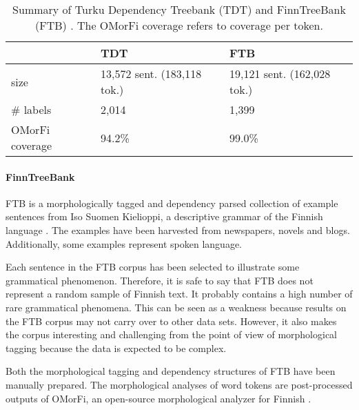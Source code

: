\begin{table}[htb!]
\begin{center}
\begin{tabular}{l|l|l} 
 & TDT & FTB \\
\hline
size & 13,572 sent. (183,118 tok.) & 19,121 sent. (162,028 tok.) \\
\# labels & 2,014 & 1,399 \\
OMorFi coverage & 94.2\% & 99.0\% \\
\end{tabular}
\end{center}
\caption{Summary of Turku Dependency Treebank (TDT) \citep{Haverinen2013} and FinnTreeBank (FTB) \citep{Voutilainen2011}. The OMorFi coverage refers to coverage per token.}
\label{tab:data} 
\end{table}

\paragraph{FinnTreeBank}
FTB is a morphologically tagged and dependency parsed collection of
example sentences from Iso Suomen Kielioppi, a descriptive grammar of
the Finnish language \citep{Hakulinen2004}. The examples have been
harvested from newspapers, novels and blogs. Additionally, some
examples represent spoken language. 

Each sentence in the FTB corpus has been selected to illustrate some
grammatical phenomenon. Therefore, it is safe to say that FTB does not
represent a random sample of Finnish text. It probably contains a high
number of rare grammatical phenomena. This can be seen as a weakness
because results on the FTB corpus may not carry over to other data
sets. However, it also makes the corpus interesting and challenging
from the point of view of morphological tagging because the data is
expected to be complex.

Both the morphological tagging and dependency structures of FTB have
been manually prepared.  The morphological analyses of word tokens are
post-processed outputs of OMorFi, an open-source morphological
analyzer for Finnish
\citep{Pirinen2011}. %

